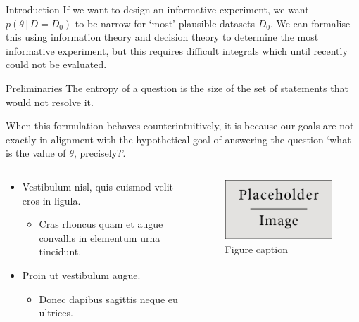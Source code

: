 \documentclass[final,hyperref={pdfpagelabels=false}]{beamer}
\newcommand{\given}{\,|\,}
\begin{document}
\begin{frame}[t]
\begin{columns}[t]
\begin{column}{.465\textwidth}
\begin{block}{Introduction}
If we want to design an informative experiment, we want
$p(\theta \given D = D_0)$ to be narrow for `most' plausible datasets
$D_0$. We can formalise this using information theory and decision theory
to determine the most informative experiment, but this requires difficult
integrals which until recently could not be evaluated.

\end{block}


\begin{block}{Preliminaries}
The entropy of a question is the size of the set of statements
that would not resolve it.


When this formulation behaves counterintuitively, it is because our goals
are not exactly in alignment with the hypothetical goal of answering the
question `what is the value of $\theta$, precisely?'.

\begin{columns} %
\begin{column}{.54\textwidth} %
\begin{itemize}
\item Vestibulum nisl, quis euismod velit eros in ligula.
\begin{itemize}
\item Cras rhoncus quam et augue convallis in elementum urna tincidunt.
\end{itemize}
\item Proin ut vestibulum augue.
\begin{itemize}
\item Donec dapibus sagittis neque eu ultrices.
\end{itemize}
\end{itemize}
\end{column}

\begin{column}{.43\textwidth} %
\centering
\begin{figure}
\includegraphics[width=0.8\linewidth]{placeholder.jpg}
\caption{Figure caption}
\end{figure}
\end{column}
\end{columns} %


\end{block}
\end{column}
\end{columns}
\end{frame}
\end{document}
